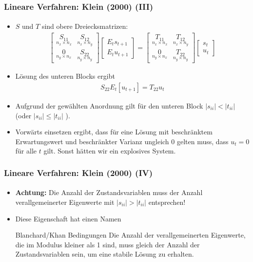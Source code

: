 \documentclass[10pt]{beamer}  %
\begin{document}
\begin{frame}
\frametitle{Lineare Verfahren: Klein (2000) (III)}\framesubtitle{}
\begin{itemize}
\item $S$ und $T$ sind obere Dreiecksmatrizen:
\begin{align*}
\begin{bmatrix} \underset{n_x \times n_x}{S_{11}} & \underset{n_x \times n_y}{S_{12}} \\ \underset{n_y \times n_x}{0} & \underset{n_y \times n_y}{S_{22}}\end{bmatrix} \begin{bmatrix} E_t s_{t+1}\\ E_t u_{t+1} \end{bmatrix} = \begin{bmatrix} \underset{n_x \times n_x}{T_{11}} & \underset{n_x \times n_y}{T_{12}} \\ \underset{n_y \times n_x}{0} & \underset{n_y \times n_y}{T_{22}}\end{bmatrix} \begin{bmatrix} s_t \\ u_t \end{bmatrix}
\end{align*}
\item L\"{o}sung des unteren Blocks ergibt
\begin{align*}
  S_{22} E_t[u_{t+1}] = T_{22} u_t
\end{align*}
\item Aufgrund der gew\"{a}hlten Anordnung gilt f\"{u}r den unteren Block $|s_{ii}|<|t_{ii}|$ (oder $|s_{ii}|\leq|t_{ii}|$ ).
\item Vorw\"{a}rts einsetzen ergibt, dass f\"{u}r eine L\"{o}sung mit beschr\"{a}nktem Erwartungswert und beschr\"{a}nkter Varianz ungleich 0 gelten muss, dass $u_t=0$ f\"{u}r alle $t$ gilt. Sonst h\"{a}tten wir ein explosives System.
\end{itemize}
\end{frame}

\begin{frame}
\frametitle{Lineare Verfahren: Klein (2000) (IV)}\framesubtitle{}
\begin{itemize}
\item \textbf{Achtung:} Die Anzahl der Zustandsvariablen muss der Anzahl verallgemeinerter Eigenwerte mit $|s_{ii}|>|t_{ii}|$ entsprechen!
\item Diese Eigenschaft hat einen Namen
\begin{block}{Blanchard/Khan Bedingungen}
Die Anzahl der verallgemeinerten Eigenwerte, die im Modulus kleiner als 1 sind, muss gleich der Anzahl der Zustandsvariablen sein, um eine stabile L\"{o}sung zu erhalten.
\end{block}
\end{itemize}
\end{frame}
\end{document}
